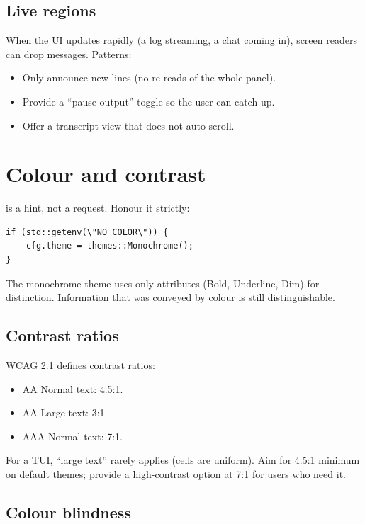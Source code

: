 \subsection*{Live regions}

When the UI updates rapidly (a log streaming, a chat coming
in), screen readers can drop messages. Patterns:

\begin{itemize}[leftmargin=*]
  \item Only announce new lines (no re-reads of the whole
    panel).
  \item Provide a ``pause output'' toggle so the user can
    catch up.
  \item Offer a transcript view that does not auto-scroll.
\end{itemize}

\section{Colour and contrast}

 is a hint, not a request. Honour it
strictly:

\begin{lstlisting}
if (std::getenv(\"NO_COLOR\")) {
    cfg.theme = themes::Monochrome();
}
\end{lstlisting}

The monochrome theme uses only attributes (Bold, Underline,
Dim) for distinction. Information that was conveyed by colour
is still distinguishable.

\subsection*{Contrast ratios}

WCAG 2.1 defines contrast ratios:

\begin{itemize}[leftmargin=*]
  \item AA Normal text: 4.5:1.
  \item AA Large text: 3:1.
  \item AAA Normal text: 7:1.
\end{itemize}

For a TUI, ``large text'' rarely applies (cells are uniform).
Aim for 4.5:1 minimum on default themes; provide a
high-contrast option at 7:1 for users who need it.

\subsection*{Colour blindness}

